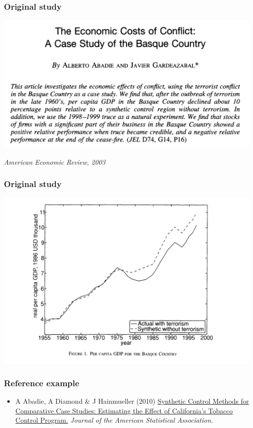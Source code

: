 \documentclass[aspectratio=43]{beamer}
\begin{document}
\begin{frame}
\frametitle{Original study}
\centering

\includegraphics[width = \textwidth]{../img/abadie2003}

\textit{American Economic Review, 2003}

\end{frame}

\begin{frame}
\frametitle{Original study}
\centering

\includegraphics[width = \textwidth]{../img/abadie2003b}

\end{frame}

\begin{frame}
\frametitle{Reference example}
\centering

\begin{itemize}
  \item A Abadie, A Diamond & J Hainmueller (2010) \href{https://web.stanford.edu/~jhain/Paper/JASA2010.pdf}{Synthetic Control Methods for Comparative Case Studies: Estimating the Effect of California's Tobacco Control Program.} \textit{Journal of the American Statistical Association.}
\end{itemize}

\end{frame}
\end{document}
